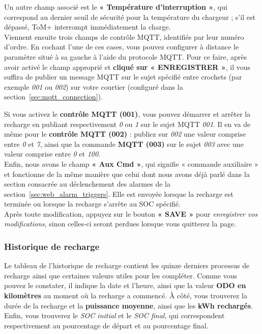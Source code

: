 {Un autre champ associé est le \textbf{« Température d'interruption »}, qui correspond au dernier seuil de sécurité
pour la température du chargeur ; s’il est dépassé, ToM+ interrompt immédiatement la charge.\\


Viennent ensuite trois champs de contrôle MQTT, identifiés par leur numéro d’ordre.
En cochant l’une de ces cases, vous pouvez configurer à distance le paramètre situé à sa gauche
à l’aide du protocole MQTT. Pour ce faire, après avoir activé le champ approprié et
\textbf{cliqué sur « ENREGISTRER »}, il vous suffira de publier un message MQTT sur le sujet
spécifié entre crochets (par exemple \textit{001} ou \textit{002}) sur votre courtier
(configuré dans la section~\ref{sec:mqtt_connection}).

Si vous activez le \textbf{contrôle MQTT (001)}, vous pouvez démarrer et arrêter
la recharge en publiant respectivement \textit{0} ou \textit{1} sur le sujet MQTT \textit{001}.
Il en va de même pour le \textbf{contrôle MQTT (002)} : publiez sur \textit{002} une valeur comprise entre
\textit{0} et \textit{7}, ainsi que la commande \textbf{MQTT (003)} sur le sujet \textit{003} avec une valeur
comprise entre \textit{0} et \textit{100}.\\

Enfin, nous avons le champ \textbf{« Aux Cmd »}, qui signifie « commande auxiliaire »
et fonctionne de la même manière que celui dont nous avons déjà parlé dans la section consacrée au déclenchement des alarmes de la
section~\ref{sec:web_alarm_triggers}. Elle est envoyée lorsque la recharge est terminée ou
lorsque la recharge s’arrête au SOC spécifié.\\


Après toute modification, appuyez sur le bouton \textbf{« SAVE »} pour \textit{enregistrer vos modifications}, sinon celles-ci seront perdues lorsque vous quitterez la page.

\subsubsection{Historique de recharge}

Le tableau de l’historique de recharge contient les quinze derniers processus de recharge ainsi que certaines
valeurs utiles pour les compléter. Comme vous pouvez le constater, il indique la date et l’heure, ainsi que
la valeur \textbf{ODO en kilomètres} au moment où la recharge a commencé. À côté, vous trouverez la
durée de la recharge et la \textbf{puissance moyenne}, ainsi que les \textbf{kWh rechargés}.
Enfin, vous trouverez le \textit{SOC initial} et le \textit{SOC final}, qui correspondent respectivement au pourcentage de départ et au pourcentage final.\\


}
